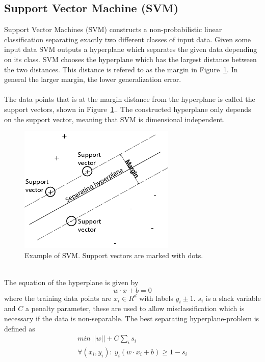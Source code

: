 \subsection{Support Vector Machine (SVM)}
Support Vector Machines (SVM) constructs a non-probabilistic linear classification separating exactly two different classes of input data. Given some input data SVM outputs a hyperplane which separates the given data depending on its class. SVM chooses the hyperplane which has the largest distance between the two distances. This distance is refered to as the margin in Figure~\ref{fig:svm}. In general the larger margin, the lower generalization error. \citep{svm_ai} \\\\
The data points that is at the margin distance from the hyperplane is called the support vectors, shown in Figure~\ref{fig:svm}.. The constructed hyperplane only depends on the support vector, meaning that SVM is dimensional independent.
\begin{figure}[h!]
\centering
\includegraphics[scale = 0.7]{fig/svmhyperplane.png}
\caption{Example of SVM. Support vectors are marked with dots. \citep{svm_picture}}
\label{fig:svm}
\end{figure} \\
The equation of the hyperplane is given by 
\begin{equation}
w \cdot x + b = 0
\end{equation}
where the training data points are $x_i \in R^d$ with labels $y_i \pm 1$. $s_i$ is a slack variable and $C$ a penalty parameter, these are used to allow misclassification which is necessary if the data is non-separable. The best separating hyperplane-problem is defined as
\begin{equation}
\begin{array}{l}
min \: ||w|| + C \sum_{i} s_i \\
\forall (x_i, y_i) : \: y_i(w \cdot x_i + b) \geq 1 - s_i
\end{array}
\end{equation}
